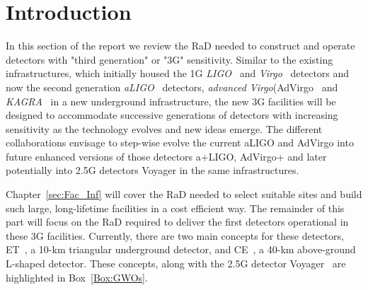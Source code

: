 \chapter{Introduction}
\label{sec:Intro}
\setcounter{page}{1}
\vspace{-1.5cm}
In this section of the report we review the \ac{RaD} needed to construct and operate detectors with "third generation" or "\ac{3G}" sensitivity. 
Similar to the existing infrastructures, which initially housed the \ac{1G} \textit{\ac{LIGO}}~\cite{Abbott2009} and \textit{\ac{Virgo}}~\cite{VirgoStatus2008} detectors and now the second generation \textit{\ac{aLIGO}}~\cite{AdvancedLIGO2015} detectors, \textit{advanced Virgo}(\ac{AdVirgo}~\cite{AdvancedVirgo2015} and \textit{\ac{KAGRA}}~\cite{KAGRA2013} in a new underground infrastructure, the new \ac{3G} facilities will be designed to accommodate successive generations of detectors with increasing sensitivity as the technology evolves and new ideas emerge.
The different collaborations envisage to step-wise evolve the current \ac{aLIGO} and \ac{AdVirgo} into future enhanced versions of those detectors \ac{a+LIGO}, \ac{AdVirgo+} \cite{Zucker:LIGOAplus, Cagnoli:VirgoAplus} and later potentially into \ac{2.5G}  detectors \ac{Voyager}\cite{VoyagerDCC2018} in the same infrastructures.

 Chapter~\ref{sec:Fac_Inf} will cover the \ac{RaD} needed to select suitable sites and build such large, long-lifetime facilities in a cost efficient way. The remainder of this part will focus on the \ac{RaD} required to deliver the first detectors operational in these \ac{3G} facilities.  Currently, there are two main concepts for these detectors, \acf{ET}~\cite{ET2011}, a 10-km triangular underground detector, and \acf{CE}~\cite{CosmicExplorer2017}, a 40-km above-ground L-shaped detector. These concepts, along with the \ac{2.5G}  detector \ac{Voyager}~\cite{Voyager:Inst,VoyagerDCC2018} are highlighted in Box~\ref{Box:GWOs}.

